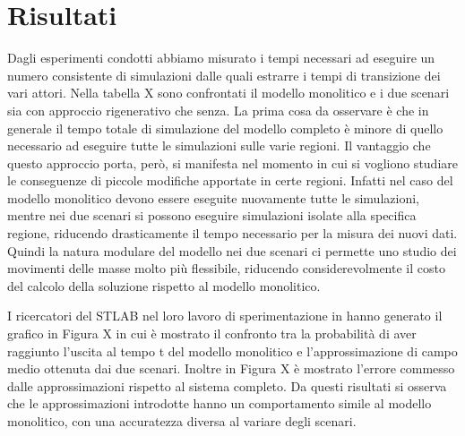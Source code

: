 \section{Risultati}

Dagli esperimenti condotti abbiamo misurato i tempi necessari ad eseguire un numero consistente di simulazioni dalle quali estrarre i tempi di transizione dei vari attori. Nella tabella X sono confrontati il modello monolitico e i due scenari sia con approccio rigenerativo che senza. La prima cosa da osservare è che in generale il tempo totale di simulazione del modello completo è minore di quello necessario ad eseguire tutte le simulazioni sulle varie regioni. Il vantaggio che questo approccio porta, però, si manifesta nel momento in cui si vogliono studiare le conseguenze di piccole modifiche apportate in certe regioni. Infatti nel caso del modello monolitico devono essere eseguite nuovamente tutte le simulazioni, mentre nei due scenari si possono eseguire simulazioni isolate alla specifica regione, riducendo drasticamente il tempo necessario per la misura dei nuovi dati. Quindi la natura modulare del modello nei due scenari ci permette uno studio dei movimenti delle masse molto più flessibile, riducendo considerevolmente il costo del calcolo della soluzione rispetto al modello monolitico.

I ricercatori del STLAB nel loro lavoro di sperimentazione in \cite{esperimenti-sandro} hanno generato il grafico in Figura X in cui è mostrato il confronto tra la probabilità di aver raggiunto l'uscita al tempo t del modello monolitico e l'approssimazione di campo medio ottenuta dai due scenari. Inoltre in Figura X è mostrato l'errore commesso dalle approssimazioni rispetto al sistema completo. Da questi risultati si osserva che le approssimazioni introdotte hanno un comportamento simile al modello monolitico, con una accuratezza diversa al variare degli scenari.

 